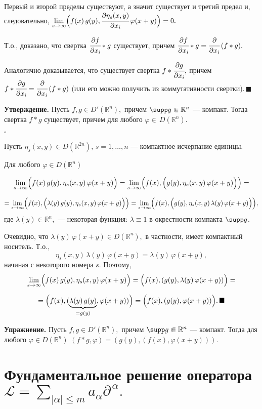 \documentclass[unicode,12pt,draft]{article}
\begin{document}
Первый и второй пределы существуют, а значит существует и третий
предел и, следовательно,
$\lim\limits_{s\to\infty}\Bigl(f(x)\,g(y),\cfrac{\partial\eta_s(x,y)}{\partial
x_i}\,\varphi(x+y)\Bigr)=0.$

Т.о., доказано, что свертка $\cfrac{\partial f}{\partial x_i}*g$
существует, причем $\cfrac{\partial f}{\partial
x_i}*g=\cfrac{\partial}{\partial x_i}\,(f*g).$

Аналогично доказывается, что существует свертка $f*\cfrac{\partial
g}{\partial x_i},$ причем $f*\cfrac{\partial g}{\partial
x_i}=\cfrac{\partial}{\partial x_i}\,(f*g)$ (или его можно
получить из коммутативности свертки).$\,\blacksquare$

\textbf{Утверждение.} Пусть $f,g\in D'(\mathbb R^n),$ причем
$\supp g\Subset\mathbb R^n$ --- компакт. Тогда свертка $f*g$
существует, причем для любого $\varphi\in\,D(\mathbb R^n).$

$\square$

Пусть $\eta_s(x,y)\in D(\mathbb R^{2n}),\,s=1,\ldots,n$ ---
компактное исчерпание единицы.

Для любого $\varphi\in D(\mathbb R^n)$

$$\lim\limits_{s\to\infty}\Bigl(f(x)\,g(y),\eta_s(x,y)\,\varphi(x+y)\Bigr)=
\lim\limits_{s\to\infty}\Bigl(f(x),\Bigl(g(y),\eta_s(x,y)\,\varphi(x+y)\Bigr)\Bigr)=$$

$$=\lim\limits_{s\to\infty}\Bigl(f(x),\Bigl(\lambda(y)\,g(y),\eta_s(x,y)\,\varphi(x+y)\Bigr)\Bigr)
=\lim\limits_{s\to\infty}\Bigl(f(x),\Bigl(g(y),\eta_s(x,y)\,\lambda(y)\,\varphi(x+y)\Bigr)\Bigr),$$
где $\lambda(y)\in\mathbb R^n,$ --- некоторая функция:
$\lambda\equiv1$ в окрестности компакта $\supp g$.

Очевидно, что $\lambda(y)\,\varphi(x+y)\in D(\mathbb R^n),$ в
частности, имеет компактный носитель. Т.о.,
$$\eta_s(x,y)\,\lambda(y)\,\varphi(x+y)=\lambda(y)\,\varphi(x+y),$$
начиная с некоторого номера $s$. Поэтому,
$$\lim\limits_{s\to\infty}\Bigl(f(x)\,g(y),\eta_s(x,y)\,\varphi(x+y)\Bigr)
=\Bigl(f(x),(g(y),\lambda(y)\,\varphi(x+y))\Bigr)=$$

$$=\Bigl(f(x),(\underbrace{\lambda(y)\,g(y)}_{=g(y)},\varphi(x+y))\Bigr)=
\Bigl(f(x),(g(y),\varphi(x+y))\Bigr).\,\blacksquare$$

\textbf{Упражнение.} Пусть $f,g\in D'(\mathbb R^n),$ причем $\supp
g\Subset\mathbb R^n$ --- компакт. Тогда для любого $\varphi\in
D(\mathbb R^n)\,\, (f*g,\varphi)=(g(y),(f(x),\varphi(x+y))).$


\section{Фундаментальное решение оператора $\mathcal
L=\sum\limits_{|\alpha|\le m}a_{\alpha}{\partial^{\, \alpha}}.$}
\end{document}
